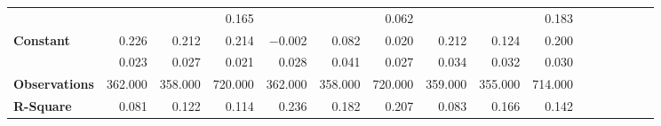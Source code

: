 \begin{tabular}{@{\extracolsep{5pt}}lrrrrrrrrrrrrrrr}
{\bf } & \phantom{***} & \phantom{***} & 0.165\phantom{\phantom{)}***} & \phantom{***} & \phantom{***} & 0.062\phantom{\phantom{)}***} & \phantom{***} & \phantom{***} & 0.183\phantom{\phantom{)}***} \\
{\bf Constant} & 0.226\phantom{\phantom{)}***} & 0.212\phantom{\phantom{)}***} & 0.214\phantom{\phantom{)}***} & $-$0.002\phantom{\phantom{)}***} & 0.082\phantom{\phantom{)}***} & 0.020\phantom{\phantom{)}***} & 0.212\phantom{\phantom{)}***} & 0.124\phantom{\phantom{)}***} & 0.200\phantom{\phantom{)}***} \\
{\bf } & 0.023\phantom{\phantom{)}***} & 0.027\phantom{\phantom{)}***} & 0.021\phantom{\phantom{)}***} & 0.028\phantom{\phantom{)}***} & 0.041\phantom{\phantom{)}***} & 0.027\phantom{\phantom{)}***} & 0.034\phantom{\phantom{)}***} & 0.032\phantom{\phantom{)}***} & 0.030\phantom{\phantom{)}***} \\
{\bf Observations} & 362.000\phantom{\phantom{)}***} & 358.000\phantom{\phantom{)}***} & 720.000\phantom{\phantom{)}***} & 362.000\phantom{\phantom{)}***} & 358.000\phantom{\phantom{)}***} & 720.000\phantom{\phantom{)}***} & 359.000\phantom{\phantom{)}***} & 355.000\phantom{\phantom{)}***} & 714.000\phantom{\phantom{)}***} \\
{\bf R-Square} & 0.081\phantom{***} & 0.122\phantom{***} & 0.114\phantom{***} & 0.236\phantom{***} & 0.182\phantom{***} & 0.207\phantom{***} & 0.083\phantom{***} & 0.166\phantom{***} & 0.142\phantom{***} \\
\hline
\end{tabular}
